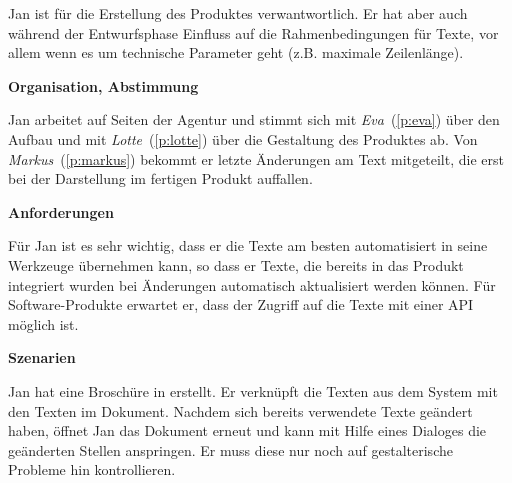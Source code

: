 \begin{multicols}{2}

\begin{center}
\end{center}


Jan ist für die Erstellung des Produktes verwantwortlich. Er hat aber auch während der Entwurfsphase Einfluss auf die Rahmenbedingungen für Texte, vor allem wenn es um technische Parameter geht (z.B. maximale Zeilenlänge).

\textbf{Organisation, Abstimmung}

Jan arbeitet auf Seiten der Agentur und stimmt sich mit \emph{Eva}~(\ref{p:eva}) über den Aufbau und mit \emph{Lotte}~(\ref{p:lotte}) über die Gestaltung des Produktes ab. Von \emph{Markus}~(\ref{p:markus}) bekommt er letzte Änderungen am Text mitgeteilt, die erst bei der Darstellung im fertigen Produkt auffallen.

\textbf{Anforderungen}

Für Jan ist es sehr wichtig, dass er die Texte am besten automatisiert in seine Werkzeuge übernehmen kann, so dass er Texte, die bereits in das Produkt integriert wurden bei Änderungen automatisch aktualisiert werden können. Für Software-Produkte erwartet er, dass der Zugriff auf die Texte mit einer API möglich ist.

\columnbreak

\textbf{Szenarien}

Jan hat eine Broschüre in  erstellt. Er verknüpft die Texten aus dem System mit den Texten im Dokument. Nachdem sich bereits verwendete Texte geändert haben, öffnet Jan das Dokument erneut und kann mit Hilfe eines Dialoges die geänderten Stellen anspringen. Er muss diese nur noch auf gestalterische Probleme hin kontrollieren.


\end{multicols}
